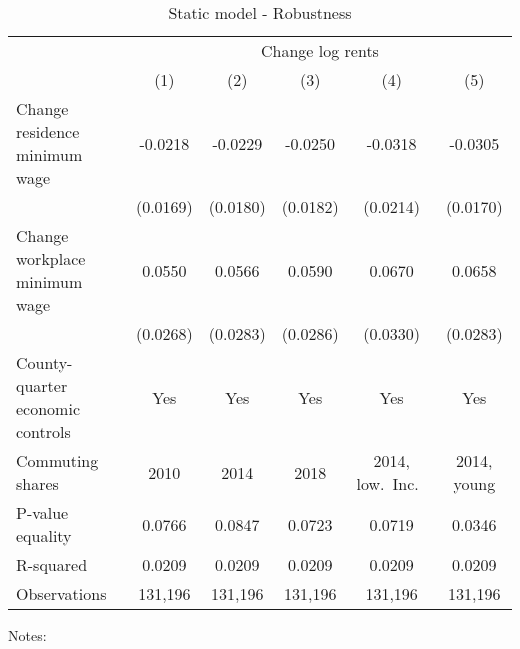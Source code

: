 \begin{table}
    \caption{Static model - Robustness}
    \label{tab:static_expMW_sensitivity}
    \centering

    \begin{tabular}{@{}lccccc@{}}
        \toprule
                                                     & \multicolumn{5}{c}{Change log rents}                               \\ \cmidrule(l){2-6}
                                                     & (1)       & (2)        & (3)        &  (4)        & (5)            \\ \midrule
        Change residence minimum wage             & -0.0218      & -0.0229         & -0.0250       & -0.0318        & -0.0305                 \\
                                                  & (0.0169)    & (0.0180)       & (0.0182)     & (0.0214)      & (0.0170)               \\
        Change workplace minimum wage             & 0.0550      & 0.0566         & 0.0590       & 0.0670        & 0.0658                 \\
                                                  & (0.0268)    & (0.0283)       & (0.0286)     & (0.0330)      & (0.0283)               \\
        County-quarter economic controls               & Yes      &  Yes        & Yes       & Yes        & Yes                 \\
        Commuting shares                               & 2010     &  2014       & 2018    & 2014, low.\ Inc.\    & 2014, young    \\
        P-value equality                          & 0.0766      & 0.0847         & 0.0723       & 0.0719        & 0.0346                 \\
        R-squared                                 & 0.0209      & 0.0209         & 0.0209       & 0.0209        & 0.0209                 \\
        Observations                              & 131,196     & 131,196        & 131,196      & 131,196       & 131,196               \\ \bottomrule
    \end{tabular}

    \begin{minipage}{.95\textwidth} \footnotesize
        \vspace{2mm}
        Notes: 
    \end{minipage}
\end{table}

